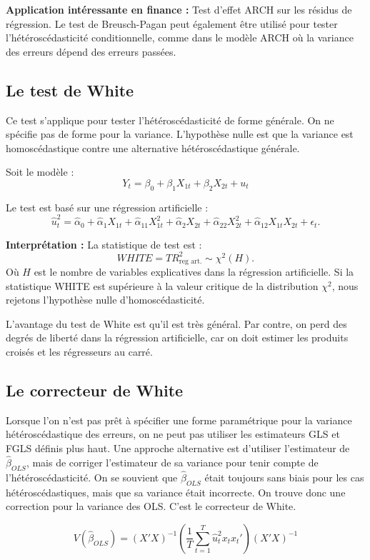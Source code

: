 \documentclass[14pt]{extarticle} %
\theoremstyle{definition}
\theoremstyle{plain}
\begin{document}
\textbf{Application intéressante en finance :} Test d’effet ARCH sur les résidus de régression. Le test de Breusch-Pagan peut également être utilisé pour tester l'hétéroscédasticité conditionnelle, comme dans le modèle ARCH où la variance des erreurs dépend des erreurs passées.

\subsection{Le test de White}
Ce test s’applique pour tester l’hétéroscédasticité de forme générale. On ne spécifie pas de forme pour la variance. L’hypothèse nulle est que la variance est homoscédastique contre une alternative hétéroscédastique générale.

Soit le modèle :
\[
Y_t = \beta_0 + \beta_1 X_{1t} + \beta_2 X_{2t} + u_t
\]

Le test est basé sur une régression artificielle :
\[
\hat{u}_t^2 = \hat{\alpha}_0 + \hat{\alpha}_1 X_{1t} + \hat{\alpha}_{11} X_{1t}^2 + \hat{\alpha}_2 X_{2t} + \hat{\alpha}_{22} X_{2t}^2 + \hat{\alpha}_{12} X_{1t} X_{2t} + \epsilon_t.
\]

\textbf{Interprétation :} La statistique de test est :
\[
WHITE = T R_{\text{reg art.}}^2 \sim \chi^2(H).
\]
Où $H$ est le nombre de variables explicatives dans la régression artificielle. Si la statistique WHITE est supérieure à la valeur critique de la distribution $\chi^2$, nous rejetons l'hypothèse nulle d'homoscédasticité.

L’avantage du test de White est qu’il est très général. Par contre, on perd des degrés de liberté dans la régression artificielle, car on doit estimer les produits croisés et les régresseurs au carré.

\subsection{Le correcteur de White}
Lorsque l’on n’est pas prêt à spécifier une forme paramétrique pour la variance hétéroscédastique des erreurs, on ne peut pas utiliser les estimateurs GLS et FGLS définis plus haut. Une approche alternative est d’utiliser l’estimateur de $\hat{\beta}_{OLS}$, mais de corriger l’estimateur de sa variance pour tenir compte de l’hétéroscédasticité. On se souvient que $\hat{\beta}_{OLS}$ était toujours sans biais pour les cas hétéroscédastiques, mais que sa variance était incorrecte. On trouve donc une correction pour la variance des OLS. C’est le correcteur de White.

\[
V(\hat{\beta}_{OLS}) = (X'X)^{-1} \left( \frac{1}{T} \sum_{t=1}^T \hat{u}_t^2 x_t x_t' \right) (X'X)^{-1}
\]
\end{document}
